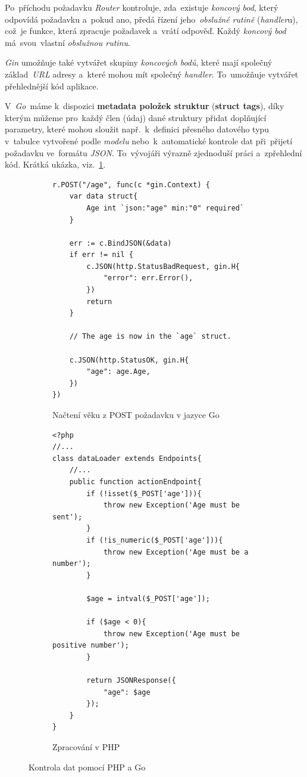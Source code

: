 \documentclass[11pt,a4paper]{report}
\begin{document}
            Po~příchodu požadavku \emph{Router} kontroluje, zda~existuje \emph{koncový bod}, který odpovídá požadavku a~pokud ano, předá řízení jeho~\emph{obslužné rutině} (\emph{handler}u), což~je funkce, která zpracuje požadavek a~vrátí odpověď. Každý \emph{koncový bod} má~svou~vlastní \emph{obslužnou rutinu}.
            
            \emph{Gin} umožňuje také vytvářet skupiny \emph{koncových bodů}, které mají společný základ~\emph{URL} adresy a~které mohou mít společný \emph{handler}. To~umožňuje vytvářet přehlednější kód aplikace.

            V~\emph{Go}~máme k~dispozici \textbf{metadata položek struktur} (\textbf{struct tags}), díky kterým můžeme pro~každý člen (údaj) dané struktury přidat doplňující parametry, které mohou sloužit např.~k~definici přesného datového typu v~tabulce vytvořené podle \emph{modelu} nebo~k~automatické kontrole dat při~přijetí požadavku ve~formátu \emph{JSON}. To~vývojáři výrazně zjednoduší práci a~zpřehlední kód. Krátká ukázka, viz.~\ref{go:structuretags}.

            \begin{figure}
                \begin{subfigure}[b]{0.45\linewidth}
                    \begin{verbatim}
r.POST("/age", func(c *gin.Context) {
    var data struct{
        Age int `json:"age" min:"0" required`
    }

    err := c.BindJSON(&data)
    if err != nil {
        c.JSON(http.StatusBadRequest, gin.H{
            "error": err.Error(),
        })
        return
    }

    // The age is now in the `age` struct.

    c.JSON(http.StatusOK, gin.H{
        "age": age.Age,
    })
})
                    \end{verbatim}
                    \caption{Načtení věku z POST požadavku v jazyce Go}
                \end{subfigure}
                \hfill
                \begin{subfigure}[b]{0.45\linewidth}
                    \begin{verbatim}
<?php
//...
class dataLoader extends Endpoints{
    //...
    public function actionEndpoint{
        if (!isset($_POST['age'])){
            throw new Exception('Age must be sent');
        }
        if (!is_numeric($_POST['age'])){
            throw new Exception('Age must be a number');
        }

        $age = intval($_POST['age']);

        if ($age < 0){
            throw new Exception('Age must be positive number');
        }

        return JSONResponse({
            "age": $age
        });
    }
}

                    \end{verbatim}
                    \caption{Zpracování v PHP}
                \end{subfigure}
                \caption{Kontrola dat pomocí PHP a Go}
                \label{go:structuretags}
            \end{figure}
            
\end{document}
